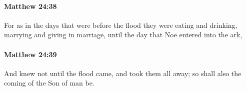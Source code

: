 		\paragraph{Matthew 24:38} %
			\label{MATTHEW-24-38}

			For as in the days that were before the flood they were eating and drinking, marrying and giving in marriage, until the day that Noe entered into the ark,

			\begin{framed}
			\scriptsize
				\begin{compactdesc}
					\item[SBLG] 
				\end{compactdesc}
			\end{framed}

		\paragraph{Matthew 24:39} %
			\label{MATTHEW-24-39}

			And knew not until the flood came, and took them all away; so shall also the coming of the Son of man be.

